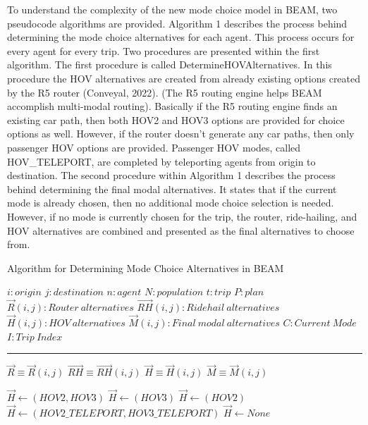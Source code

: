 \documentclass[fancy, masters]{byuthesis}
\begin{document}
To understand the complexity of the new mode choice model in BEAM, two pseudocode algorithms are provided. Algorithm 1 describes the process behind determining the mode choice alternatives for each agent. This process occurs for every agent for every trip. Two procedures are presented within the first algorithm. The first procedure is called DetermineHOVAlternatives. In this procedure the HOV alternatives are created from already existing options created by the R5 router (Conveyal, 2022). (The R5 routing engine helps BEAM accomplish multi-modal routing). Basically if the R5 routing engine finds an existing car path, then both HOV2 and HOV3 options are provided for choice options as well. However, if the router doesn't generate any car paths, then only passenger HOV options are provided. Passenger HOV modes, called HOV\_TELEPORT, are completed by teleporting agents from origin to destination. The second procedure within Algorithm 1 describes the process behind determining the final modal alternatives. It states that if the current mode is already chosen, then no additional mode choice selection is needed. However, if no mode is currently chosen for the trip, the router, ride-hailing, and HOV alternatives are combined and presented as the final alternatives to choose from.

\begin{algorithm} [tph]
\caption{Algorithm for Determining Mode Choice Alternatives in BEAM}
\begin{algorithmic}[1]
\Require
\State $i : origin$
\State $j : destination$
\State $n: agent$
\State $N: population$
\State $t : trip $
\State $P : plan$
\State $\vec{R}(i,j) : Router\: alternatives$
\State $\vec{RH}(i,j) : Ridehail\:alternatives$
\State $\vec{H}(i,j) : HOV\:alternatives$
\State $\vec{M}(i,j) : Final\:modal\:alternatives$
\State $C : Current\:Mode$
\State $I : Trip\:Index$
\vspace{4pt}\hrule\vspace{5pt}

\State $\vec{R} \equiv \vec{R}(i,j)$
\State $\vec{RH} \equiv \vec{RH}(i,j)$
\State $\vec{H} \equiv \vec{H}(i,j)$
\State $\vec{M} \equiv \vec{M}(i,j)$

    \State $\vec{H} \gets (HOV2,HOV3)$
    \State $\vec{H} \gets (HOV3)$
    \State $\vec{H} \gets (HOV2)$
    \State $\vec{H} \gets (HOV2\_TELEPORT, HOV3\_TELEPORT)$
  \EndIf
\Else
  \State $\vec{H} \gets None$
\EndIf
\EndProcedure
\Statex
{}
\end{algorithmic}
\end{algorithm}
\end{document}
